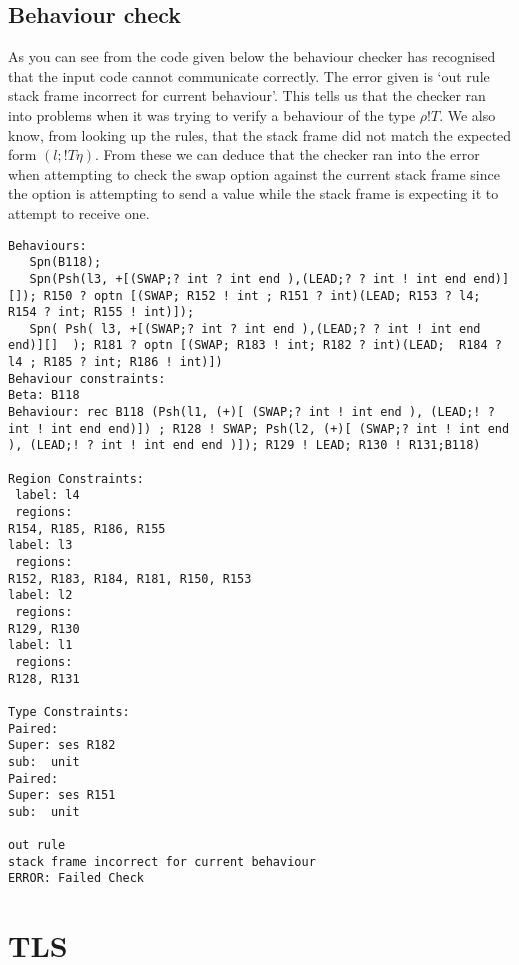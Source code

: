 \subsection{Behaviour check}

As you can see from the code given below the behaviour checker has recognised that the input code cannot communicate correctly. The error given is `out rule stack frame incorrect for current behaviour'. This tells us that the checker ran into problems when it was trying to verify a behaviour of the type $\rho!T$. We also know, from looking up the rules, that the stack frame did not match the expected form $(l; !T\eta)$. From these we can deduce that the checker ran into the error when attempting to check the swap option against the current stack frame since the option is attempting to send a value while the stack frame is expecting it to attempt to receive one. 

\begin{lstlisting}
Behaviours:
   Spn(B118);
   Spn(Psh(l3, +[(SWAP;? int ? int end ),(LEAD;? ? int ! int end end)][]); R150 ? optn [(SWAP; R152 ! int ; R151 ? int)(LEAD; R153 ? l4; R154 ? int; R155 ! int)]);  
   Spn( Psh( l3, +[(SWAP;? int ? int end ),(LEAD;? ? int ! int end end)][]  ); R181 ? optn [(SWAP; R183 ! int; R182 ? int)(LEAD;  R184 ? l4 ; R185 ? int; R186 ! int)])
Behaviour constraints:
Beta: B118 
Behaviour: rec B118 (Psh(l1, (+)[ (SWAP;? int ! int end ), (LEAD;! ? int ! int end end)]) ; R128 ! SWAP; Psh(l2, (+)[ (SWAP;? int ! int end ), (LEAD;! ? int ! int end end )]); R129 ! LEAD; R130 ! R131;B118)

Region Constraints:
 label: l4
 regions:
R154, R185, R186, R155
label: l3
 regions:
R152, R183, R184, R181, R150, R153
label: l2
 regions:
R129, R130
label: l1
 regions:
R128, R131

Type Constraints:
Paired: 
Super: ses R182 
sub:  unit 
Paired: 
Super: ses R151
sub:  unit 

out rule
stack frame incorrect for current behaviour
ERROR: Failed Check
\end{lstlisting}

\FloatBarrier
\section{TLS}
\label{tlsexampsec}

